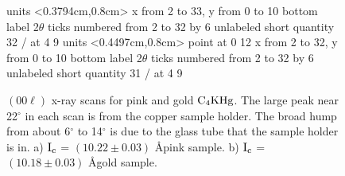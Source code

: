 


\pagestyle{empty}

\begin{figure}
\beginpicture
\setcoordinatesystem units <0.3794cm,0.8cm>
\setplotarea x from 2 to 33, y from 0 to 10
\axis bottom label {2$\theta$} ticks 
	numbered from 2 to 32 by 6
	unlabeled short quantity 32 /
 at 4 9
\setcoordinatesystem units <0.4497cm,0.8cm> point at 0 12 
\setplotarea x from 2 to 32, y from 0 to 10
\axis bottom label {2$\theta$} ticks 
	numbered from 2 to 32 by 6
	unlabeled short quantity 31 /
 at 4 9
\endpicture
\caption[$(00\ell)$ x-ray scans for pink and gold $\rm C_4KHg$.]{$(00\ell)$
x-ray   scans for    pink and  gold   $\rm C_4KHg$.   The large peak   near
22$^{\circ}$ in each scan is from the copper sample holder.  The broad hump
from about 6$^{\circ}$ to  14$^{\circ}$ is due to the  glass tube  that the
sample holder is  in.  a) $\rm I_c$ =  $(10.22 \pm 0.03)$ \AA pink  sample.
b) $\rm I_c$ = $(10.18 \pm 0.03)$ \AA gold sample.}
\label{stixr}
\end{figure}

